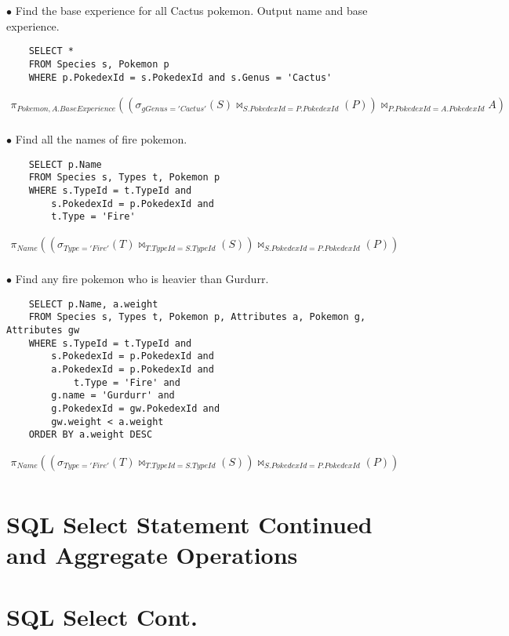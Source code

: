 \documentclass[twoside]{article}
\begin{document}
$\bullet$ Find the base experience for all Cactus pokemon. Output name and base
experience.
\begin{verbatim}
    SELECT *
    FROM Species s, Pokemon p
    WHERE p.PokedexId = s.PokedexId and s.Genus = 'Cactus'
\end{verbatim}
\begin{gather*}
    \pi_{Pokemon, A.BaseExperience}((\sigma_{gGenus = 'Cactus'}(S) 
    \bowtie_{S.PokedexId = P.PokedexId}(P)) 
    \bowtie_{P.PokedexId = A.PokedexId}A) \\
\end{gather*}

$\bullet$ Find all the names of fire pokemon.
\begin{verbatim}
    SELECT p.Name
    FROM Species s, Types t, Pokemon p
    WHERE s.TypeId = t.TypeId and 
        s.PokedexId = p.PokedexId and
        t.Type = 'Fire'
\end{verbatim}
\begin{gather*}
    \pi_{Name}((\sigma_{Type = 'Fire'}(T) \bowtie_{T.TypeId = S.TypeId}(S)) 
    \bowtie_{S.PokedexId = P.PokedexId}(P)) \\
\end{gather*}

$\bullet$ Find any fire pokemon who is heavier than Gurdurr.
\begin{verbatim}
    SELECT p.Name, a.weight
    FROM Species s, Types t, Pokemon p, Attributes a, Pokemon g, Attributes gw
    WHERE s.TypeId = t.TypeId and 
        s.PokedexId = p.PokedexId and
        a.PokedexId = p.PokedexId and
            t.Type = 'Fire' and
        g.name = 'Gurdurr' and
        g.PokedexId = gw.PokedexId and
        gw.weight < a.weight
    ORDER BY a.weight DESC
\end{verbatim}
\begin{gather*}
    \pi_{Name}((\sigma_{Type = 'Fire'}(T) \bowtie_{T.TypeId = S.TypeId}(S)) 
    \bowtie_{S.PokedexId = P.PokedexId}(P)) \\
\end{gather*}

\newpage
\section{SQL Select Statement Continued and Aggregate Operations}

\section*{SQL Select Cont.}
\end{document}
